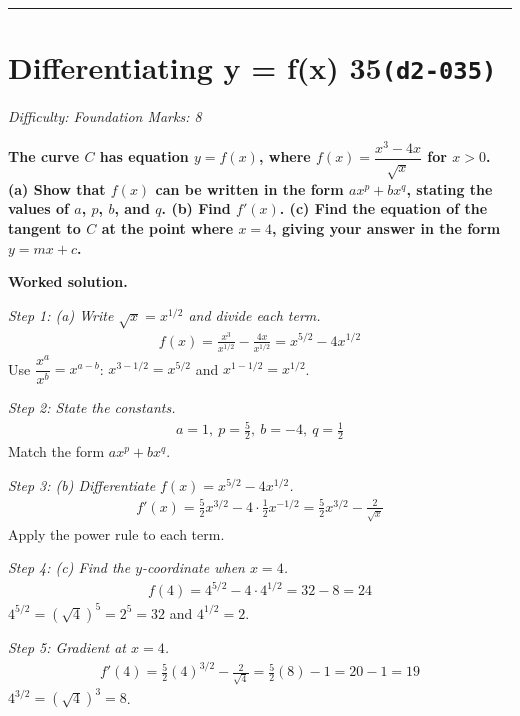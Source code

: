 \documentclass[11pt]{article}
\newcommand{\question}[1]{\par\medskip\noindent\textbf{#1}\par}
\begin{document}
\medskip\hrule

\section*{Differentiating y = f(x) 35\quad\small\texttt{(d2-035)}}
\textit{Difficulty: Foundation \quad\textbar\quad Marks: 8}

\question{The curve \( C \) has equation \( y = f(x) \), where \( f(x) = \dfrac{x^3 - 4x}{\sqrt{x}} \) for \( x > 0 \). (a) Show that \( f(x) \) can be written in the form \( ax^p + bx^q \), stating the values of \( a \), \( p \), \( b \), and \( q \). (b) Find \( f'(x) \). (c) Find the equation of the tangent to \( C \) at the point where \( x = 4 \), giving your answer in the form \( y = mx + c \).}

\textbf{Worked solution.}

\textit{Step 1: (a) Write \( \sqrt{x} = x^{1/2} \) and divide each term.}
\[\begin{gathered}
f(x) = \frac{x^3}{x^{1/2}} - \frac{4x}{x^{1/2}} = x^{5/2} - 4x^{1/2}
\end{gathered}\]
Use \( \dfrac{x^a}{x^b} = x^{a-b} \): \( x^{3-1/2} = x^{5/2} \) and \( x^{1-1/2} = x^{1/2} \).

\textit{Step 2: State the constants.}
\[\begin{gathered}
a = 1,\ p = \tfrac{5}{2},\ b = -4,\ q = \tfrac{1}{2}
\end{gathered}\]
Match the form \( ax^p + bx^q \).

\textit{Step 3: (b) Differentiate \( f(x) = x^{5/2} - 4x^{1/2} \).}
\[\begin{gathered}
f'(x) = \tfrac{5}{2}x^{3/2} - 4 \cdot \tfrac{1}{2}x^{-1/2} = \tfrac{5}{2}x^{3/2} - \frac{2}{\sqrt{x}}
\end{gathered}\]
Apply the power rule to each term.

\textit{Step 4: (c) Find the \( y \)-coordinate when \( x = 4 \).}
\[\begin{gathered}
f(4) = 4^{5/2} - 4 \cdot 4^{1/2} = 32 - 8 = 24
\end{gathered}\]
\( 4^{5/2} = (\sqrt{4})^5 = 2^5 = 32 \) and \( 4^{1/2} = 2 \).

\textit{Step 5: Gradient at \( x = 4 \).}
\[\begin{gathered}
f'(4) = \tfrac{5}{2}(4)^{3/2} - \frac{2}{\sqrt{4}} = \tfrac{5}{2}(8) - 1 = 20 - 1 = 19
\end{gathered}\]
\( 4^{3/2} = (\sqrt{4})^3 = 8 \).
\end{document}
